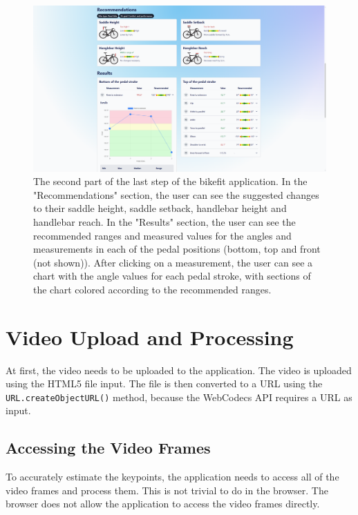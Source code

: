 \begin{figure}[htbp]
    \centering
    \includegraphics[width=\textwidth]{obrazky-figures/step3-bot.png}
    \caption{The second part of the last step of the bikefit application. In the "Recommendations" section, the user can see the suggested changes to their saddle height, saddle setback, handlebar height and handlebar reach. In the "Results" section, the user can see the recommended ranges and measured values for the angles and measurements in each of the pedal positions (bottom, top and front (not shown)). After clicking on a measurement, the user can see a chart with the angle values for each pedal stroke, with sections of the chart colored according to the recommended ranges.}
    \label{fig:step3-bottom}
\end{figure}





\section{Video Upload and Processing}
\label{video_upload_and_processing}
At first, the video needs to be uploaded to the application. The video is uploaded using the HTML5 file input. The file is then converted to a URL using the \texttt{URL.createObjectURL()} method, because the WebCodecs API requires a URL as input.

\subsection{Accessing the Video Frames}

To accurately estimate the keypoints, the application needs to access all of the video frames and process them. This is not trivial to do in the browser. The browser does not allow the application to access the video frames directly.

